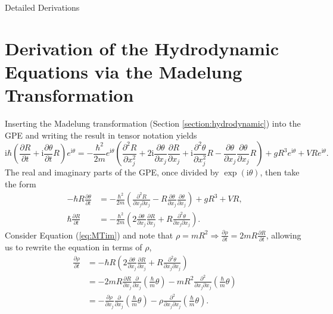 \begin{chapter}{Detailed Derivations\label{app:App2}}
\section{\label{appsection:madtrans} Derivation of the Hydrodynamic Equations via the Madelung Transformation}
Inserting the Madelung transformation (Section \ref{section:hydrodynamic}) into the GPE and writing the result in tensor notation yields
\begin{equation*}
  \mathrm{i}\hbar\left( \frac{\partial R}{\partial t} + \mathrm{i}\frac{\partial \theta}{\partial t} R \right)e^{\mathrm{i}\theta} =
  -\frac{\hbar^2}{2m}e^{\mathrm{i}\theta}\left( \frac{\partial^2 R}{\partial x_j^2} + 2\mathrm{i}\frac{\partial \theta}{\partial x_j}\frac{\partial R}{\partial x_j}+
  \mathrm{i}\frac{\partial^2 \theta}{\partial x_j^2}R -  \frac{\partial \theta}{\partial x_j}\frac{\partial \theta}{\partial x_j} R  \right) + gR^3e^{\mathrm{i}\theta} + VRe^{\mathrm{i}\theta}.
\end{equation*}
The real and imaginary parts of the GPE, once divided by $\exp (\mathrm{i}\theta)$, then take the form
\begin{align}
  -\hbar R \frac{\partial \theta}{\partial t} &= -\frac{\hbar^2}{2m}\left( \frac{\partial^2 R}{\partial x_j \partial x_j} - R \frac{\partial \theta}{\partial x_j}\frac{\partial \theta}{\partial x_j}  \right) + gR^3 + VR, \label{eq:MTre}\\
  \hbar \frac{\partial R}{\partial t} &= -\frac{\hbar^2}{2m}\left( 2\frac{\partial \theta}{\partial x_j}\frac{\partial R}{\partial x_j} + R \frac{\partial^2 \theta}{\partial x_j \partial x_j} \right).
  \label{eq:MTim}
\end{align}
Consider Equation (\ref{eq:MTim}) and note that $\rho = mR^2 \Rightarrow \frac{\partial \rho}{\partial t} = 2mR\frac{\partial R}{\partial t}$, allowing us to rewrite the equation in terms of $\rho$,
\begin{align*}
  \frac{\partial \rho}{\partial t} &= -\hbar R\left( 2 \frac{\partial \theta}{\partial x_j} \frac{\partial R}{\partial x_j} + R \frac{\partial^2 \theta}{\partial x_j\partial x_j} \right)\\
  &= -2mR\frac{\partial R}{\partial x_j}\frac{\partial}{\partial x_j}\left( \frac{\hbar}{m} \theta \right) - mR^2 \frac{\partial^2}{\partial x_j \partial x_j}\left(\frac{\hbar}{m}\theta \right)\\
  &= -\frac{\partial \rho}{\partial x_j}\frac{\partial}{\partial x_j}\left( \frac{\hbar}{m} \theta \right) - \rho \frac{\partial^2}{\partial x_j \partial x_j}\left(\frac{\hbar}{m}\theta \right).

\end{align*}
\end{chapter}
